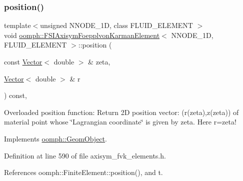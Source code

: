 \mbox{\label{classoomph_1_1FSIAxisymFoepplvonKarmanElement_a9fc819d4f7a036a45bd62a484c9749d7}} 
\subsubsection{\texorpdfstring{position()}{position()}\hspace{0.1cm}{\footnotesize\ttfamily [1/2]}}
{\footnotesize\ttfamily template$<$unsigned N\+N\+O\+D\+E\+\_\+1D, class F\+L\+U\+I\+D\+\_\+\+E\+L\+E\+M\+E\+NT $>$ \\
void \hyperlink{classoomph_1_1FSIAxisymFoepplvonKarmanElement}{oomph\+::\+F\+S\+I\+Axisym\+Foepplvon\+Karman\+Element}$<$ N\+N\+O\+D\+E\+\_\+1D, F\+L\+U\+I\+D\+\_\+\+E\+L\+E\+M\+E\+NT $>$\+::position (\begin{DoxyParamCaption}\item[{const \hyperlink{classoomph_1_1Vector}{Vector}$<$ double $>$ \&}]{zeta,  }\item[{\hyperlink{classoomph_1_1Vector}{Vector}$<$ double $>$ \&}]{r }\end{DoxyParamCaption}) const\hspace{0.3cm}{\ttfamily [inline]}, {\ttfamily [virtual]}}



Overloaded position function\+: Return 2D position vector\+: (r(zeta),z(zeta)) of material point whose \char`\"{}\+Lagrangian coordinate\char`\"{} is given by zeta. Here r=zeta! 



Implements \hyperlink{classoomph_1_1GeomObject_a0d04c9d4667817f3ef24bb660fd56065}{oomph\+::\+Geom\+Object}.



Definition at line 590 of file axisym\+\_\+fvk\+\_\+elements.\+h.



References oomph\+::\+Finite\+Element\+::position(), and t.

\mbox{\label{classoomph_1_1FSIAxisymFoepplvonKarmanElement_a9c86ac02c60541d451ceb50eb49914ed}} 
